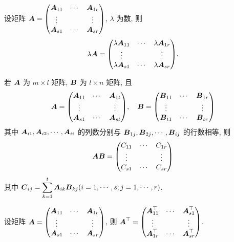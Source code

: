 \begin{theorem}[分块矩阵的数乘]
    设矩阵 $ \vb*{A}=\mqty(\vb*{A}_{11} & \cdots & \vb*{A}_{1 r} \\ \vdots & & \vdots \\ \vb*{A}_{s 1} & \cdots & \vb*{A}_{s r})$, $\lambda $ 为数, 则
    $$\lambda  \vb*{A}=\mqty(\lambda  \vb*{A}_{11} & \cdots & \lambda  \vb*{A}_{1 r} \\
        \vdots & & \vdots \\
        \lambda  \vb*{A}_{s 1} & \cdots & \lambda  \vb*{A}_{s r}).$$
\end{theorem}

\begin{theorem}[分块矩阵的乘法]
    若 $ \vb*{A} $ 为 $ m \times l $ 矩阵, $ \vb*{B} $ 为 $ l \times n $ 矩阵, 且
    $$\vb*{A}=\mqty(\vb*{A}_{11}  & \cdots & \vb*{A}_{1 t} \\
        \vdots        &        & \vdots        \\
        \vb*{A}_{s 1} & \cdots & \vb*{A}_{s t})
        , \quad \vb*{B}=\mqty(\vb*{B}_{11}  & \cdots & \vb*{B}_{1 r} \\
        \vdots        &        & \vdots        \\
        \vb*{B}_{t 1} & \cdots & \vb*{B}_{t r})$$
    其中 $ \vb*{A}_{i 1}, \vb*{A}_{i 2}, \cdots, \vb*{A}_{i i} $ 的列数分别与 $ \vb*{B}_{1 j}, \vb*{B}_{2 j}, \cdots, \vb*{B}_{i j} $ 的行数相等, 则
    $$\vb*{A B}=\mqty(C_{11}  & \cdots & C_{1 r} \\
        \vdots  &        & \vdots  \\
        C_{s 1} & \cdots & C_{s r})$$
    其中 $ \vb*{C}_{i j}=\displaystyle \sum_{k=1}^{t} \vb*{A}_{i k} \vb*{B}_{k j}(i=1, \cdots, s ; j=1, \cdots, r) $.
\end{theorem}

\begin{theorem}[分块矩阵的转置]
    设矩阵 $ \vb*{A}=\mqty(\vb*{A}_{11} & \cdots & \vb*{A}_{1 r} \\ \vdots & & \vdots \\ \vb*{A}_{s 1} & \cdots & \vb*{A}_{s r})
    $, 则 $ \vb*{A}^{\top}=\mqty(\vb*{A}_{11}^{\top} & \cdots & \vb*{A}_{s 1}^{\top} \\ \vdots & & \vdots \\ \vb*{A}_{1 r}^{\top} & \cdots & \vb*{A}_{s r}^{\top}) $.
\end{theorem}

